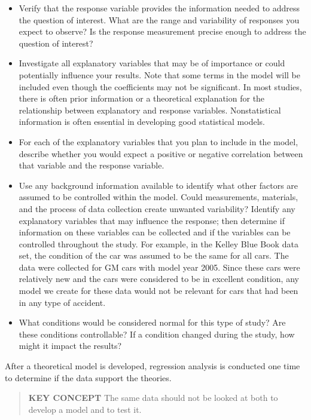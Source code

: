 \documentclass[
]{report}
\begin{document}
\begin{itemize}
\item
  Verify that the response variable provides the information needed to address the question of interest. What are the range and variability of responses you expect to observe? Is the response measurement precise enough to address the question of interest?
\item
  Investigate all explanatory variables that may be of importance or could potentially influence your results. Note that some terms in the model will be included even though the coefficients may not be significant. In most studies, there is often prior information or a theoretical explanation for the relationship between explanatory and response variables. Nonstatistical information is often essential in developing good statistical models.
\item
  For each of the explanatory variables that you plan to include in the model, describe whether you would expect a positive or negative correlation between that variable and the response variable.
\item
  Use any background information available to identify what other factors are assumed to be controlled within the model. Could measurements, materials, and the process of data collection create unwanted variability? Identify any explanatory variables that may influence the response; then determine if information on these variables can be collected and if the variables can be controlled throughout the study. For example, in the Kelley Blue Book data set, the condition of the car was assumed to be the same for all cars. The data were collected for GM cars with model year 2005. Since these cars were relatively new and the cars were considered to be in excellent condition, any model we create for these data would not be relevant for cars that had been in any type of accident.
\item
  What conditions would be considered normal for this type of study? Are these conditions controllable? If a condition changed during the study, how might it impact the results?
\end{itemize}

After a theoretical model is developed, regression analysis is conducted one time to determine if the data support the theories.

\begin{quote}
\textbf{KEY CONCEPT} The same data should not be looked at both to develop a model and to test it.
\end{quote}
\end{document}
